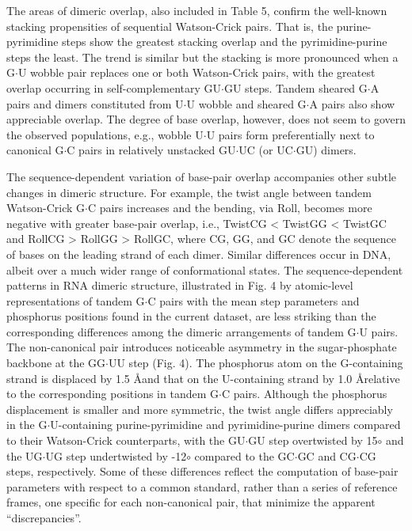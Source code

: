 The areas  of dimeric overlap, also  included in Table  5, confirm the
well-known   stacking    propensities   of   sequential   Watson-Crick
pairs. That is, the purine-pyrimidine steps show the greatest stacking
overlap  and  the pyrimidine-purine  steps  the  least.  The trend  is
similar but  the stacking is  more pronounced when a  G$\cdot$U wobble
pair  replaces  one or  both  Watson-Crick  pairs,  with the  greatest
overlap  occurring  in  self-complementary GU$\cdot$GU  steps.  Tandem
sheared G$\cdot$A pairs and dimers constituted from U$\cdot$U wobble
and sheared G$\cdot$A pairs also show appreciable overlap.  The degree
of  base  overlap, however,  does  not  seem  to govern  the  observed
populations, e.g., wobble U$\cdot$U pairs form preferentially next to
canonical  G$\cdot$C  pairs in  relatively  unstacked GU$\cdot$UC  (or
UC$\cdot$GU) dimers.

The  sequence-dependent variation of  base-pair overlap  accompanies
other  subtle changes  in dimeric  structure. For  example,  the twist
angle between  tandem Watson-Crick  G$\cdot$C pairs increases  and the
bending,  via Roll,  becomes  more negative  with  greater base-pair
overlap,  i.e., TwistCG  < TwistGG  < TwistGC  and RollCG  >  RollGG >
RollGC,  where CG,  GG, and  GC denote  the sequence  of bases  on the
leading strand of each dimer. Similar differences occur in DNA, albeit
over  a  much  wider  range  of  conformational  states.  The
sequence-dependent patterns in RNA dimeric structure, illustrated in
Fig. 4 by atomic-level  representations of tandem G$\cdot$C pairs with
the mean step parameters and phosphorus positions found in the current
dataset, are less striking  than the corresponding differences among
the dimeric arrangements of  tandem G$\cdot$U pairs. The non-canonical
pair introduces  noticeable asymmetry in  the sugar-phosphate backbone
at  the  GG$\cdot$UU  step  (Fig.  4).  The  phosphorus  atom  on  the
G-containing strand is displaced by 1.5 \AA and that on the U-containing
strand  by 1.0  \AA relative  to the  corresponding positions  in tandem
G$\cdot$C pairs. Although the phosphorus displacement is smaller and
more  symmetric,  the  twist   angle  differs  appreciably  in  the
G$\cdot$U-containing purine-pyrimidine and pyrimidine-purine dimers
compared to their Watson-Crick counterparts, with the GU$\cdot$GU step
overtwisted  by 15$\circ$  and  the UG$\cdot$UG  step undertwisted  by
-12$\circ$ compared to the GC$\cdot$GC and CG$\cdot$CG steps, respectively. Some
of these  differences reflect the computation  of base-pair parameters
with respect to  a common standard, rather than  a series of reference
frames, one  specific for each  non-canonical pair, that  minimize the
apparent ``discrepancies''.



